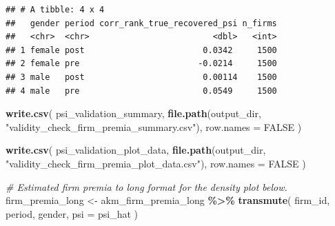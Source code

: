 \documentclass[
]{article}
\newenvironment{Shaded}{\begin{snugshade}}{\end{snugshade}}
\newcommand{\AttributeTok}[1]{\textcolor[rgb]{0.13,0.29,0.53}{#1}}
\newcommand{\CommentTok}[1]{\textcolor[rgb]{0.56,0.35,0.01}{\textit{#1}}}
\newcommand{\ConstantTok}[1]{\textcolor[rgb]{0.56,0.35,0.01}{#1}}
\newcommand{\FunctionTok}[1]{\textcolor[rgb]{0.13,0.29,0.53}{\textbf{#1}}}
\newcommand{\NormalTok}[1]{#1}
\newcommand{\OtherTok}[1]{\textcolor[rgb]{0.56,0.35,0.01}{#1}}
\newcommand{\SpecialCharTok}[1]{\textcolor[rgb]{0.81,0.36,0.00}{\textbf{#1}}}
\newcommand{\StringTok}[1]{\textcolor[rgb]{0.31,0.60,0.02}{#1}}
\begin{document}
\begin{verbatim}
## # A tibble: 4 x 4
##   gender period corr_rank_true_recovered_psi n_firms
##   <chr>  <chr>                         <dbl>   <int>
## 1 female post                        0.0342     1500
## 2 female pre                        -0.0214     1500
## 3 male   post                        0.00114    1500
## 4 male   pre                         0.0549     1500
\end{verbatim}

\begin{Shaded}
\begin{Highlighting}[]
\FunctionTok{write.csv}\NormalTok{(}
\NormalTok{    psi\_validation\_summary,}
    \FunctionTok{file.path}\NormalTok{(output\_dir, }\StringTok{"validity\_check\_firm\_premia\_summary.csv"}\NormalTok{),}
    \AttributeTok{row.names =} \ConstantTok{FALSE}
\NormalTok{)}

\FunctionTok{write.csv}\NormalTok{(}
\NormalTok{    psi\_validation\_plot\_data,}
    \FunctionTok{file.path}\NormalTok{(output\_dir, }\StringTok{"validity\_check\_firm\_premia\_plot\_data.csv"}\NormalTok{),}
    \AttributeTok{row.names =} \ConstantTok{FALSE}
\NormalTok{)}

\CommentTok{\# Estimated firm premia to long format for the density plot below.}
\NormalTok{firm\_premia\_long }\OtherTok{\textless{}{-}}\NormalTok{ akm\_firm\_premia\_long }\SpecialCharTok{\%\textgreater{}\%}
    \FunctionTok{transmute}\NormalTok{(}
\NormalTok{        firm\_id,}
\NormalTok{        period,}
\NormalTok{        gender,}
        \AttributeTok{psi =}\NormalTok{ psi\_hat}
\NormalTok{    )}


\end{Highlighting}
\end{Shaded}
\end{document}
